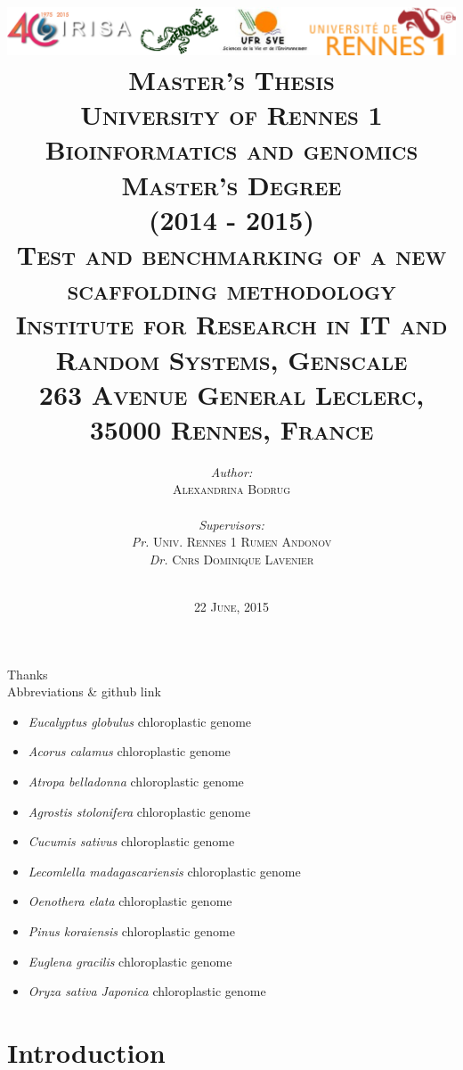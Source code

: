 \documentclass[12pt, twocolumn]{article}
\title{\includegraphics[scale=0.1]{logos} \vspace*{3\baselineskip}\\
        \large \textbf{\textsc{Master's Thesis}} \\
        \normalsize \textsc{University of Rennes 1} \\
        \normalsize \textsc{Bioinformatics and genomics Master's Degree} \\
        \normalsize \textsc{(2014 - 2015)} \vspace*{2\baselineskip} \\
		\large \textbf{\textsc{Test and benchmarking of a new scaffolding methodology}} \vspace*{0.5\baselineskip}\\
		\footnotesize \textsc{Institute for Research in IT and Random Systems, Genscale \\
		263 Avenue General Leclerc, 35000 Rennes, France}
        }
\author{\normalsize
	\begin{minipage}{0.4\textwidth}
	\begin{flushleft} 
	\emph{Author:}\\
	\textsc{Alexandrina Bodrug}
	\end{flushleft}
	\end{minipage}
	~
	\begin{minipage}{0.4\textwidth}
	\begin{flushright}
	\emph{Supervisors:} \\
	\textit{Pr.} \textsc{Univ. Rennes 1 Rumen Andonov} \\
	\textit{Dr.} \textsc{Cnrs Dominique Lavenier}
	\end{flushright}
	\end{minipage}\\[2cm]}
\date{\small \textsc{22 June, 2015}}
\begin{document}
\maketitle
\thispagestyle{empty}
\clearpage
\onecolumn
Thanks \\
\thispagestyle{empty}
\clearpage
\onecolumn
Abbreviations \& github link \\

\begin{itemize}
  \item \textit{Eucalyptus globulus} chloroplastic genome 
  \item \textit{Acorus calamus} chloroplastic genome
  \item \textit{Atropa belladonna} chloroplastic genome  
  \item \textit{Agrostis stolonifera} chloroplastic genome  
  \item \textit{Cucumis sativus} chloroplastic genome  
  \item \textit{Lecomlella madagascariensis} chloroplastic genome  
  \item \textit{Oenothera elata} chloroplastic genome  
  \item \textit{Pinus koraiensis} chloroplastic genome  
  \item \textit{Euglena gracilis} chloroplastic genome  
  \item \textit{Oryza sativa Japonica} chloroplastic genome  
\end{itemize}
\thispagestyle{empty}
\clearpage
\hypersetup{linkcolor=gray}
\tableofcontents
\thispagestyle{empty}
\newpage
\section{Introduction}
\setcounter{page}{1}
\end{document}
